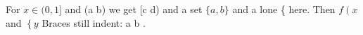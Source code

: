 \documentclass{article}
\begin{document}
For $x \in (0,1]$ and (a
b) we get [c
d) and a set $\{a,
b\}$ and a lone \{ here.
Then $f\left( x \right.$ and $\left\{ y \right.$
Braces still indent: {a
  b
}.
\end{document}
